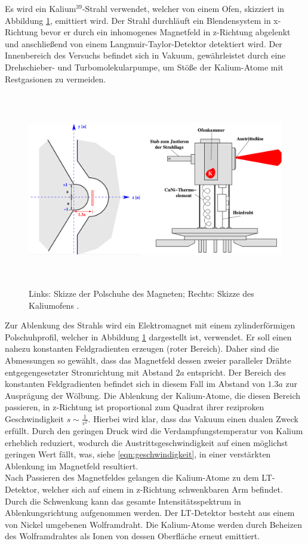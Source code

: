 Es wird ein Kalium$^{39}$-Strahl verwendet, welcher von einem Ofen, skizziert in Abbildung \ref{fig:aufbau2}, emittiert wird.
Der Strahl durchläuft ein Blendensystem in x-Richtung bevor er durch ein inhomogenes Magnetfeld in z-Richtung abgelenkt und anschließend von einem Langmuir-Taylor-Detektor detektiert wird.
Der Innenbereich des Versuchs befindet sich in Vakuum, gewährleistet durch eine Drehschieber- und Turbomolekularpumpe, um Stöße der Kalium-Atome mit Restgasionen zu vermeiden.
\begin{figure}
  \centering
  \includegraphics[height=8.5cm]{ressources/aufbau2.png}
  \caption{Links: Skizze der Polschuhe des Magneten; Rechts: Skizze des Kaliumofens \cite{skript}.}
  \label{fig:aufbau2}
\end{figure}
Zur Ablenkung des Strahls wird ein Elektromagnet mit einem zylinderförmigen Polschuhprofil, welcher in Abbildung \ref{fig:aufbau2} dargestellt ist, verwendet.
Er soll einen nahezu konstanten Feldgradienten erzeugen (roter Bereich).
Daher sind die Abmessungen so gewählt, dass das Magnetfeld dessen zweier paralleler Drähte entgegengesetzter Stromrichtung mit Abstand $2a$ entspricht.
Der Bereich des konstanten Feldgradienten befindet sich in diesem Fall im Abstand von $1.3a$ zur Ausprägung der Wölbung.
Die Ablenkung der Kalium-Atome, die diesen Bereich passieren, in z-Richtung ist proportional zum Quadrat ihrer reziproken Geschwindigkeit $s\sim \frac{1}{v^2}$.
Hierbei wird klar, dass das Vakuum einen dualen Zweck erfüllt.
Durch den geringen Druck wird die Verdampfungstemperatur von Kalium erheblich reduziert, wodurch die Austrittsgeschwindigkeit auf einen möglichst geringen Wert fällt, was, siehe \eqref{eqn:geschwindigkeit}, in einer verstärkten Ablenkung im Magnetfeld resultiert.\\
Nach Passieren des Magnetfeldes gelangen die Kalium-Atome zu dem LT-Detektor, welcher sich auf einem in z-Richtung schwenkbaren Arm befindet.
Durch die Schwenkung kann das gesamte Intensitätsspektrum in Ablenkungsrichtung aufgenommen werden.
Der LT-Detektor besteht aus einem von Nickel umgebenen Wolframdraht.
Die Kalium-Atome werden durch Beheizen des Wolframdrahtes als Ionen von dessen Oberfläche erneut emittiert.
